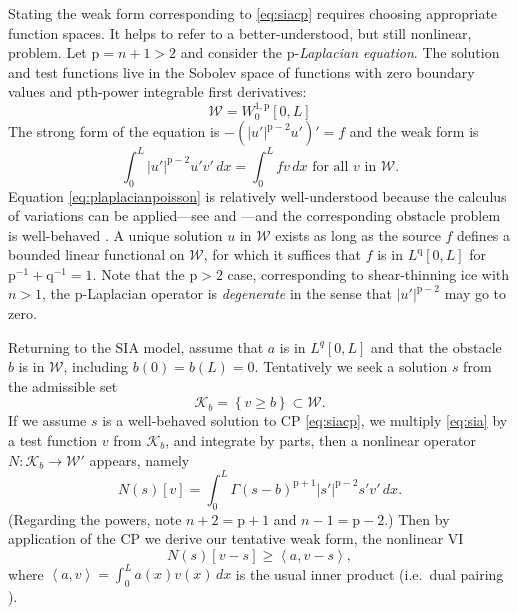 \documentclass[letterpaper,final,12pt,reqno]{amsart}
\theoremstyle{claim}
\newcommand{\ip}[2]{\left<#1,#2\right>}
\newcommand{\pp}{{\text{p}}}
\newcommand{\qq}{{\text{q}}}
\numberwithin{equation}{section}
\numberwithin{figure}{section}
\numberwithin{table}{section}
\numberwithin{theorem}{section}
\begin{document}
Stating the weak form corresponding to \eqref{eq:siacp} requires choosing appropriate function spaces.  It helps to refer to a better-understood, but still nonlinear, problem.  Let $\pp=n+1>2$ and consider the $\pp$-\emph{Laplacian equation}.  The solution and test functions live in the Sobolev space of functions with zero boundary values and $\pp$th-power integrable first derivatives:
\begin{equation}
\mathcal{W} = W_0^{1,\pp}[0,L]  \label{eq:defineW}
\end{equation}
The strong form of the equation is $-(|u'|^{\pp-2} u')' = f$ and the weak form is
\begin{equation}
\int_0^L |u'|^{\pp-2} u' v'\,dx = \int_0^L f v\,dx \text{ for all $v$ in $\mathcal{W}$.}  \label{eq:plaplacianpoisson}
\end{equation}
Equation \eqref{eq:plaplacianpoisson} is relatively well-understood because the calculus of variations can be applied---see \cite[section 5.3]{Ciarlet2002} and \cite{BarrettLiu1993}---and the corresponding obstacle problem is well-behaved \cite[for example]{ChoeLewis1991}.  A unique solution $u$ in $\mathcal{W}$ exists as long as the source $f$ defines a bounded linear functional on $\mathcal{W}$, for which it suffices that $f$ is in $L^\qq[0,L]$ for $\pp^{-1}+\qq^{-1}=1$.  Note that the $\pp>2$ case, corresponding to shear-thinning ice with $n>1$, the $\pp$-Laplacian operator is \emph{degenerate} \cite{DiBenedetto2012} in the sense that $|u'|^{\pp-2}$ may go to zero.

Returning to the SIA model, assume that $a$ is in $L^q[0,L]$ and that the obstacle $b$ is in $\mathcal{W}$, including $b(0)=b(L)=0$.  Tentatively we seek a solution $s$ from the admissible set
\begin{equation}
\mathcal{K}_b = \left\{v \ge b\right\} \subset \mathcal{W}.  \label{eq:siaK}
\end{equation}
If we assume $s$ is a well-behaved solution to CP \eqref{eq:siacp}, we multiply \eqref{eq:sia} by a test function $v$ from $\mathcal{K}_b$, and integrate by parts, then a nonlinear operator $N:\mathcal{K}_b \to \mathcal{W}'$ appears, namely
\begin{equation}
N(s)[v] = \int_0^L \Gamma (s-b)^{\pp+1} |s'|^{\pp-2} s' v'\,dx. \label{eq:siaNunreg}
\end{equation}
(Regarding the powers, note $n+2=\pp+1$ and $n-1=\pp-2$.)  Then by application of the CP we derive our tentative weak form, the nonlinear VI
\begin{equation}
N(s)[v-s] \ge \ip{a}{v-s}, \label{eq:siaVIunreg}
\end{equation}
where $\ip{a}{v} = \int_0^L a(x) v(x)\,dx$ is the usual inner product (i.e.~dual pairing \cite{KinderlehrerStampacchia1980}).
\end{document}
